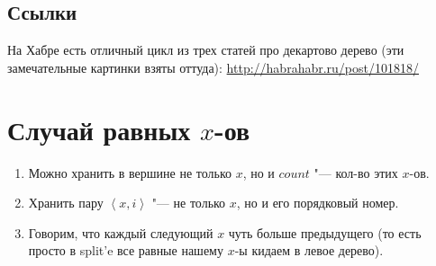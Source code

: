 \subsection{Ссылки}

На Хабре есть отличный цикл из трех статей про декартово дерево (эти замечательные картинки взяты оттуда):
\href{http://habrahabr.ru/post/101818/}{http://habrahabr.ru/post/101818/}

\section[Случай равных x-ов]{Случай равных $x$-ов}

\begin{enumerate}
	\item Можно хранить в вершине не только $x$, но и $count$ "--- кол-во этих $x$-ов.
	\item Хранить пару $\left<x, i\right>$ "--- не только $x$, но и его порядковый номер.
	\item Говорим, что каждый следующий $x$ чуть больше предыдущего (то есть просто в split'e все равные нашему $x$-ы кидаем в левое дерево).
\end{enumerate}
